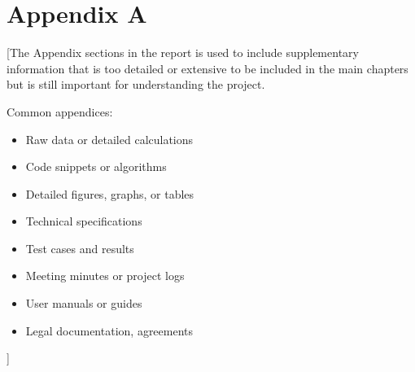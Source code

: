 \chapter*{Appendix A}
\label{chap:appendix_a}

[The Appendix sections in the report is used to include supplementary information that is too detailed or extensive to be included in the main chapters but is still important for understanding the project.

Common appendices:
\begin{itemize}
    \item Raw data or detailed calculations
    \item Code snippets or algorithms
    \item Detailed figures, graphs, or tables
    \item Technical specifications
    \item Test cases and results
    \item Meeting minutes or project logs
    \item User manuals or guides
    \item Legal documentation, agreements
\end{itemize}]

